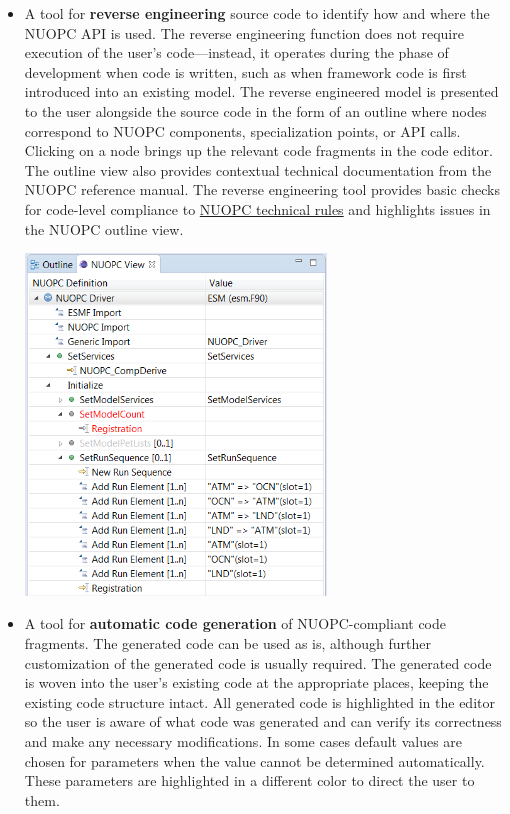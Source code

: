 \documentclass[oneside,11pt]{memoir}
\begin{document}
\begin{itemize}

\item
A tool for \textbf{reverse engineering} source code to identify how and where the NUOPC API is used. The reverse engineering function does not require execution of the user's code---instead, it operates during the phase of development when code is written, such as when framework code is first introduced into an existing model. The reverse engineered model is presented to the user alongside the source code in the form of an outline where nodes correspond to NUOPC components, specialization points, or API calls. Clicking on a node brings up the relevant code fragments in the code editor. The outline view also provides contextual technical documentation from the NUOPC reference manual. The reverse engineering tool provides basic checks for code-level compliance to \href{https://earthsystemcog.org/projects/nuopc/esmf2nuopc}{NUOPC technical rules} and highlights issues in the NUOPC outline view.

\vspace{24pt}
\parbox{\linewidth}{\centering
  \includegraphics[width=8cm]{figs/feature_reveng.png}
}
\vspace{24pt}

\item A tool for \textbf{automatic code generation} of NUOPC-compliant code fragments. The generated code can be used as is, although further customization of the generated code is usually required. The generated code is woven into the user's existing code at the appropriate places, keeping the existing code structure intact. All generated code is highlighted in the editor so the user is aware of what code was generated and can verify its correctness and make any necessary modifications. In some cases default values are chosen for parameters when the value cannot be determined automatically. These parameters are highlighted in a different color to direct the user to them. 


\end{itemize}
\end{document}
